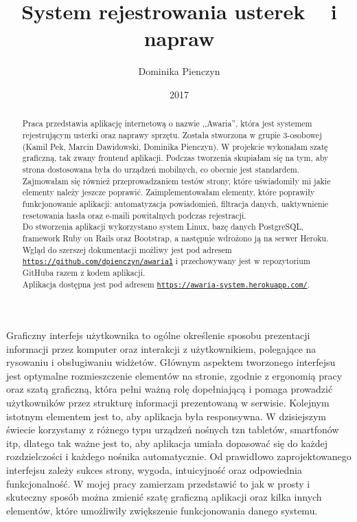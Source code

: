 \documentclass[openright]{xmgr}
\author   {Dominika Pienczyn}
\title    {System rejestrowania usterek ~ i napraw}
\date     {2017}
\begin{document}
	
	\begin{abstract}
		Praca przedstawia aplikację internetową o nazwie ,,Awaria'', która jest systemem rejestrującym usterki oraz naprawy sprzętu. Została stworzona w grupie 3-osobowej (Kamil Pek, Marcin Dawidowski, Dominika Pienczyn). W projekcie wykonałam szatę graficzną, tak zwany frontend aplikacji. Podczas tworzenia skupiałam się na tym, aby strona dostosowana była do urządzeń mobilnych, co obecnie jest standardem. Zajmowałam się również przeprowadzaniem testów strony, które uświadomiły mi jakie elementy należy jeszcze poprawić. Zaimplementowałam elementy, które poprawiły funkcjonowanie aplikacji: automatyzacja powiadomień, filtracja danych, uaktywnienie resetowania hasła oraz e-maili powitalnych podczas rejestracji.\\ 
		\indent Do stworzenia aplikacji wykorzystano system Linux, bazę danych PostgreSQL, framework Ruby on Rails oraz Bootstrap, a następnie wdrożono ją na serwer Heroku.\\
		\indent Wgląd do szerszej dokumentacji możliwy jest pod adresem \texttt{\url{https://github.com/dpienczyn/awaria1}} i przechowywany jest w repozytorium GitHuba razem z kodem aplikacji.\\
		\indent Aplikacja dostępna jest pod adresem \texttt{\url{https://awaria-system.herokuapp.com/}}.
	\end{abstract}
	
	
	\maketitle
	
	\introduction
	
	Graficzny interfejs użytkownika to ogólne określenie sposobu prezentacji informacji przez komputer oraz interakcji z użytkownikiem, polegające na rysowaniu i obsługiwaniu widżetów. Głównym aspektem tworzonego interfejsu jest optymalne rozmieszczenie elementów na stronie, zgodnie z ergonomią pracy oraz szatą graficzną, która pełni ważną rolę dopełniającą i pomaga prowadzić użytkowników przez strukturę informacji prezentowaną w serwisie. Kolejnym istotnym elementem jest to, aby aplikacja była responsywna. W dzisiejszym świecie korzystamy z różnego typu urządzeń nośnych tzn tabletów, smartfonów itp, dlatego tak ważne jest to, aby aplikacja umiała dopasować się do każdej rozdzielczości i każdego nośnika automatycznie. Od prawidłowo zaprojektowanego interfejsu zależy sukces strony, wygoda, intuicyjność oraz odpowiednia funkcjonalność. W mojej pracy zamierzam przedstawić to jak w prosty i skuteczny sposób można zmienić szatę graficzną aplikacji oraz kilka innych elementów, które umożliwiły zwiększenie funkcjonowania danego systemu.
	
\end{document}
